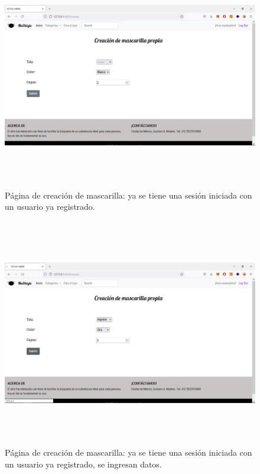 \documentclass[letterpaper,12pt]{article}
\begin{document}
\begin{figure}[H]
	\includegraphics[width=18cm, height=10cm]{13}
	\centering
	\caption{Página de creación de mascarilla: ya se tiene una sesión iniciada con un usuario ya registrado.}
\end{figure}
\begin{figure}[H]
	\includegraphics[width=18cm, height=10cm]{14}
	\centering
	\caption{Página de creación de mascarilla: ya se tiene una sesión iniciada con un usuario ya registrado, se ingresan datos.}
\end{figure}
\end{document}
